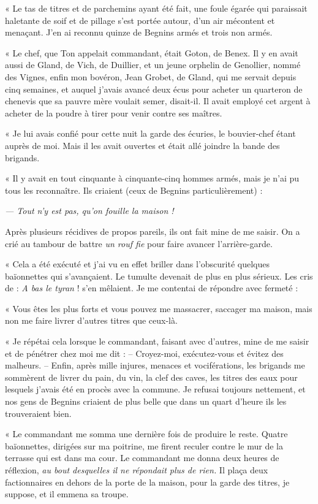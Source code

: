 \documentclass[french,twoside]{book} %
\newenvironment{quoteblock}%
  {\begin{quoting}}
  {\end{quoting}}
\newenvironment{quotebar}{%
    \def\FrameCommand{{\color{rubric!10!}\vrule width 0.5em} \hspace{0.9em}}%
    \def\OuterFrameSep{\itemsep} %
    \MakeFramed {\advance\hsize-\width \FrameRestore}
  }%
  {%
    \endMakeFramed
  }
\renewenvironment{quoteblock}%
  {%
    \savenotes
    \setstretch{0.9}
    \begin{quotebar}
  }
  {%
    \end{quotebar}
    \spewnotes
  }
\begin{document}
\begin{quoteblock}
 « Le tas de titres et de parchemins ayant été fait, une foule égarée qui paraissait haletante de soif et de pillage s’est portée autour, d’un air mécontent et menaçant. J’en ai reconnu quinze de Begnins armés et trois non armés.\par
 « Le chef, que Ton appelait commandant, était Goton, de Benex. Il y en avait aussi de Gland, de Vich, de Duillier, et un jeune orphelin de Genollier, nommé des Vignes, enfin mon bovéron, Jean Grobet, de Gland, qui me servait depuis cinq semaines, et auquel j’avais avancé deux écus pour acheter un quarteron de chenevis que sa pauvre mère voulait semer, disait-il. Il avait employé cet argent à acheter de la poudre à tirer pour venir contre ses maîtres.\par
 « Je lui avais confié pour cette nuit la garde des écuries, le bouvier-chef étant auprès de moi. Mais il les avait ouvertes et était allé joindre la bande des brigands.\par
 « Il y avait en tout cinquante à cinquante-cinq hommes armés, mais je n’ai pu tous les reconnaître. Ils criaient (ceux de Begnins particulièrement) :\par
 {\itshape — Tout n’y est pas, qu’on fouille la maison !}\par
 Après plusieurs récidives de propos pareils, ils ont fait mine de me saisir. On a crié au tambour de battre \emph{un rouf fie} pour faire avancer l’arrière-garde.\par
 « Cela a été exécuté et j’ai vu en effet briller dans l’obscurité quelques baïonnettes qui s’avançaient. Le tumulte devenait de plus en plus sérieux. Les cris de : \emph{A bas le tyran} ! s’en mêlaient. Je me contentai de répondre avec fermeté :\par
 « Vous êtes les plus forts et vous pouvez me massacrer, saccager ma maison, mais non me faire livrer d’autres titres que ceux-là.\par
 « Je répétai cela lorsque le commandant, faisant avec d’autres, mine de me saisir et de pénétrer chez moi me dit : – Croyez-moi, exécutez-vous et évitez des malheurs. – Enfin, après mille injures, menaces et vociférations, les brigands me sommèrent de livrer du pain, du vin, la clef des caves, les titres des eaux pour lesquels j’avais été en procès avec la commune. Je refusai toujours nettement, et nos gens de Begnins criaient de plus belle que dans un quart d’heure ils les trouveraient bien.\par
 « Le commandant me somma une dernière fois de produire le reste. Quatre baïonnettes, dirigées sur ma poitrine, me firent reculer contre le mur de la terrasse qui est dans ma cour. Le commandant me donna deux heures de réflexion, \emph{au bout desquelles il ne répondait plus de rien.} Il plaça deux factionnaires en dehors de la porte de la maison, pour la garde des titres, je suppose, et il emmena sa troupe.\par

\end{quoteblock}
\end{document}
